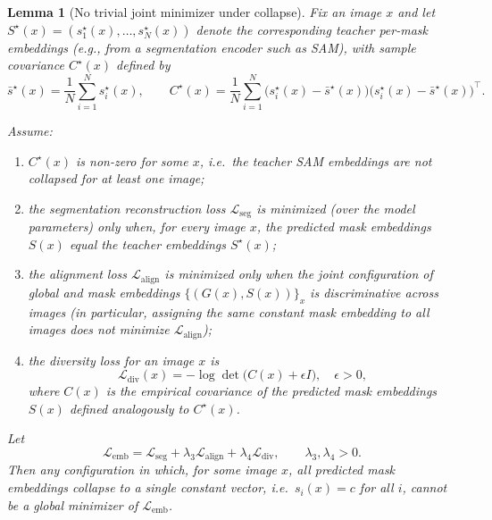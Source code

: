 \documentclass[12pt]{article}
\newtheorem{lemma}{Lemma}
\begin{document}
\begin{lemma}[No trivial joint minimizer under collapse]
Fix an image $x$ and let $S^\star(x) = (s^\star_1(x),\dots,s^\star_N(x))$
denote the corresponding teacher per-mask embeddings (e.g., from a
segmentation encoder such as SAM), with sample covariance
$C^\star(x)$ defined by
\[
\bar{s}^\star(x) = \frac{1}{N} \sum_{i=1}^N s^\star_i(x), \qquad
C^\star(x) = \frac{1}{N} \sum_{i=1}^N
\big(s^\star_i(x) - \bar{s}^\star(x)\big)\big(s^\star_i(x) - \bar{s}^\star(x)\big)^\top.
\]


Assume:
\begin{enumerate}
    \item[(i)] $C^\star(x)$ is non-zero for some $x$, i.e.\ the teacher SAM
    embeddings are not collapsed for at least one image;
    \item[(ii)] the segmentation reconstruction loss $\mathcal{L}_{\mathrm{seg}}$
    is minimized (over the model parameters) only when, for every image $x$,
    the predicted mask embeddings $S(x)$ equal the teacher embeddings
    $S^\star(x)$;
    \item[(iii)] the alignment loss $\mathcal{L}_{\mathrm{align}}$ is minimized
    only when the joint configuration of global and mask embeddings
    $\{(G(x), S(x))\}_x$ is discriminative across images (in particular,
    assigning the same constant mask embedding to all images does not minimize
    $\mathcal{L}_{\mathrm{align}}$);
    \item[(iv)] the diversity loss for an image $x$ is
    \[
    \mathcal{L}_{\mathrm{div}}(x)
    = - \log \det\big(C(x) + \epsilon I\big), \quad \epsilon > 0,
    \]
    where $C(x)$ is the empirical covariance of the predicted mask embeddings
    $S(x)$ defined analogously to $C^\star(x)$.
\end{enumerate}

Let
\[
\mathcal{L}_{\mathrm{emb}}
= \mathcal{L}_{\mathrm{seg}}
+ \lambda_3 \mathcal{L}_{\mathrm{align}}
+ \lambda_4 \mathcal{L}_{\mathrm{div}},
\qquad \lambda_3,\lambda_4 > 0.
\]
Then any configuration in which, for some image $x$, all predicted mask
embeddings collapse to a single constant vector, i.e.\ $s_i(x) = c$ for all $i$,
cannot be a global minimizer of $\mathcal{L}_{\mathrm{emb}}$.
\end{lemma}
\end{document}

